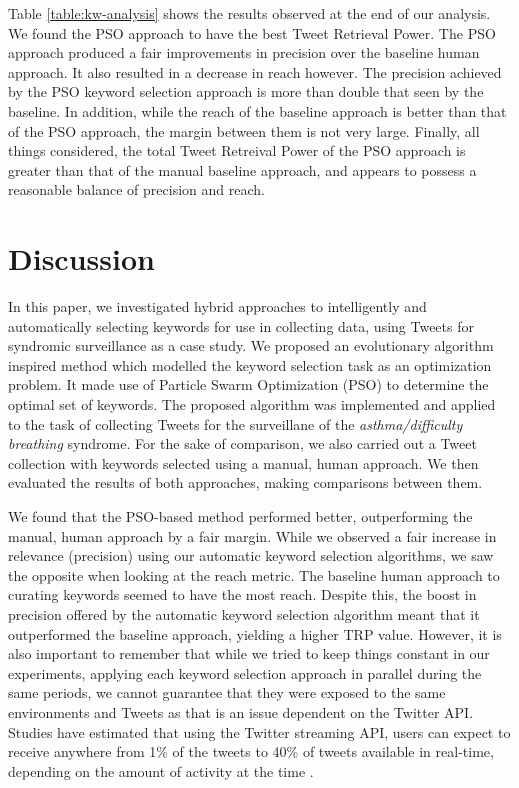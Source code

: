 \documentclass[runningheads]{llncs}
\begin{document}
Table \ref{table:kw-analysis} shows the results observed at the end of our analysis. We found the PSO approach to have the best Tweet Retrieval Power. The PSO approach produced a fair improvements in precision over the baseline human approach. It also resulted in a decrease in reach however. The precision achieved by the PSO keyword selection approach is more than double that seen by the baseline. In addition, while the reach of the baseline approach is better than that of the PSO approach, the margin between them is not very large. Finally, all things considered, the total Tweet Retreival Power of the PSO approach is greater than that of the manual baseline approach, and appears to possess a reasonable balance of precision and reach.

\section{Discussion}
In this paper, we investigated hybrid approaches to intelligently and automatically selecting keywords for use in collecting data, using Tweets for syndromic surveillance as a case study. We proposed an evolutionary algorithm inspired method which modelled the keyword selection task as an optimization problem. It made use of Particle Swarm Optimization (PSO) to determine the optimal set of keywords. The proposed algorithm was implemented and applied to the task of collecting Tweets for the surveillane of the \textit{asthma/difficulty breathing} syndrome. For the sake of comparison, we also carried out a Tweet collection with keywords selected using a manual, human approach. We then evaluated the results of both approaches, making comparisons between them.

We found that the PSO-based method performed better, outperforming the manual, human approach by a fair margin. While we observed a fair increase in relevance (precision) using our automatic keyword selection algorithms, we saw the opposite when looking at the reach metric. The baseline human approach to curating keywords seemed to have the most reach. Despite this, the boost in precision offered by the automatic keyword selection algorithm meant that it outperformed the baseline approach, yielding a higher TRP value. However, it is also important to remember that while we tried to keep things constant in our experiments, applying each keyword selection approach in parallel during the same periods, we cannot guarantee that they were exposed to the same environments and Tweets as that is an issue dependent on the Twitter API. Studies have estimated that using the Twitter streaming API, users can expect to receive anywhere  from 1\% of the tweets to 40\% of tweets available in real-time, depending on the amount of activity at the time \cite{K_REF8}. 
\end{document}
